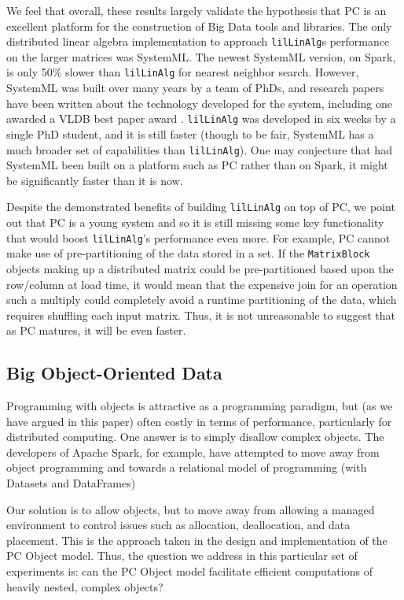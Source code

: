 We feel that overall, these results largely validate the hypothesis that PC is an excellent platform for the 
construction of Big Data tools and libraries.  The only distributed linear algebra implementation
to approach \texttt{lilLinAlg}s performance on the larger matrices
was SystemML.  The newest SystemML version, on Spark, is only 50\% slower than \texttt{lilLinAlg} for nearest neighbor search.
However,
SystemML was built over many years by a team of PhDs, and research papers have been written about the
technology developed for the system, including one awarded a VLDB best paper award \cite{boehm2016systemml}.
\texttt{lilLinAlg} was developed in six weeks by a single PhD student, and it is still
faster (though to be fair, SystemML has a much broader
set of capabilities than \texttt{lilLinAlg}).
One may conjecture that had SystemML been built on a platform such as PC rather than on Spark, it might be significantly
faster than it is now.

Despite the demonstrated benefits of building \texttt{lilLinAlg} on top of PC, we point out that
PC is a young system and so it is still missing some key functionality that would boost
\texttt{lilLinAlg}'s performance even more.  For example, PC cannot make use of pre-partitioning of the data stored in a set. 
If the
\texttt{MatrixBlock} objects making up a distributed
matrix could be pre-partitioned based upon the row/column at load time, it 
would mean that the expensive join for an operation
such a multiply could completely avoid a runtime partitioning of the data, which requires shuffling each input matrix.
Thus, it is not unreasonable to suggest that as PC matures, it will be even faster.

\subsection{Big Object-Oriented Data}

Programming with objects is attractive as a programming paradigm, but (as we have argued in this paper)
often costly in terms of performance, particularly
for distributed computing.  One answer is to simply disallow complex objects.  The 
developers of Apache Spark, for example, have attempted to move away from object programming
and towards a relational model of programming (with Datasets and DataFrames) 

Our solution is to allow objects, but to move away from allowing a managed environment to control 
issues such as allocation, deallocation, and data placement.  This is the approach taken in the design and implementation
of the PC Object model.  Thus, the question we address in this particular set of experiments is: can the PC 
Object model facilitate efficient computations of heavily nested, complex objects?

